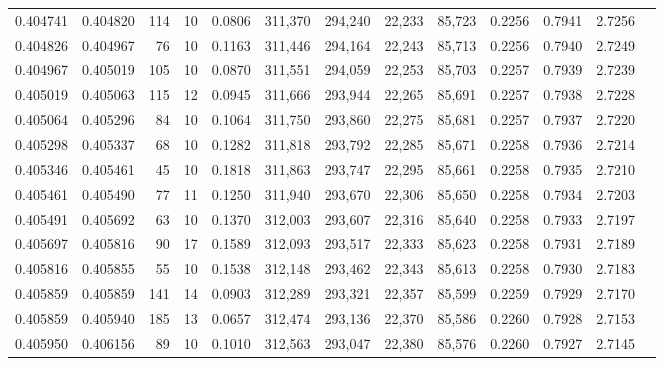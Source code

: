 \begin{tabular}{rrrrrrrrrrrrr}
0.404741 & 0.404820 &   114 &  10 &                                     0.0806 & 311,370 & 294,240 &  22,233 &  85,723 & 0.2256 & 0.7941 & 2.7256 \\
0.404826 & 0.404967 &    76 &  10 &                                     0.1163 & 311,446 & 294,164 &  22,243 &  85,713 & 0.2256 & 0.7940 & 2.7249 \\
0.404967 & 0.405019 &   105 &  10 &                                     0.0870 & 311,551 & 294,059 &  22,253 &  85,703 & 0.2257 & 0.7939 & 2.7239 \\
0.405019 & 0.405063 &   115 &  12 &                                     0.0945 & 311,666 & 293,944 &  22,265 &  85,691 & 0.2257 & 0.7938 & 2.7228 \\
0.405064 & 0.405296 &    84 &  10 &                                     0.1064 & 311,750 & 293,860 &  22,275 &  85,681 & 0.2257 & 0.7937 & 2.7220 \\
0.405298 & 0.405337 &    68 &  10 &                                     0.1282 & 311,818 & 293,792 &  22,285 &  85,671 & 0.2258 & 0.7936 & 2.7214 \\
0.405346 & 0.405461 &    45 &  10 &                                     0.1818 & 311,863 & 293,747 &  22,295 &  85,661 & 0.2258 & 0.7935 & 2.7210 \\
0.405461 & 0.405490 &    77 &  11 &                                     0.1250 & 311,940 & 293,670 &  22,306 &  85,650 & 0.2258 & 0.7934 & 2.7203 \\
0.405491 & 0.405692 &    63 &  10 &                                     0.1370 & 312,003 & 293,607 &  22,316 &  85,640 & 0.2258 & 0.7933 & 2.7197 \\
0.405697 & 0.405816 &    90 &  17 &                                     0.1589 & 312,093 & 293,517 &  22,333 &  85,623 & 0.2258 & 0.7931 & 2.7189 \\
0.405816 & 0.405855 &    55 &  10 &                                     0.1538 & 312,148 & 293,462 &  22,343 &  85,613 & 0.2258 & 0.7930 & 2.7183 \\
0.405859 & 0.405859 &   141 &  14 &                                     0.0903 & 312,289 & 293,321 &  22,357 &  85,599 & 0.2259 & 0.7929 & 2.7170 \\
0.405859 & 0.405940 &   185 &  13 &                                     0.0657 & 312,474 & 293,136 &  22,370 &  85,586 & 0.2260 & 0.7928 & 2.7153 \\
0.405950 & 0.406156 &    89 &  10 &                                     0.1010 & 312,563 & 293,047 &  22,380 &  85,576 & 0.2260 & 0.7927 & 2.7145 \\

\end{tabular}
